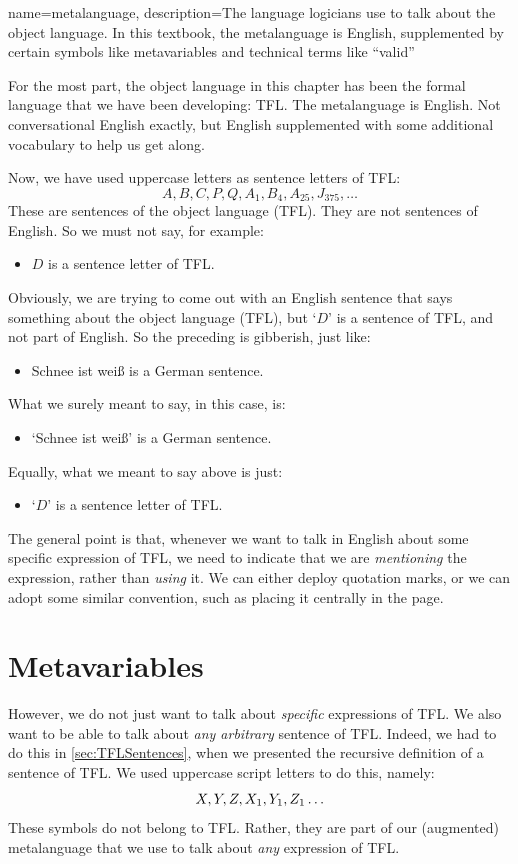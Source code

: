 {
	name=metalanguage,
	description={The language logicians use to talk about the object language. In this textbook, the metalanguage is English, supplemented by certain symbols like metavariables and technical terms like ``valid''}
}

For the most part, the object language in this chapter has been the formal language that we have been developing: TFL. The metalanguage is English. Not conversational English exactly, but English supplemented with some additional vocabulary to help us get along.

Now, we have used uppercase letters as sentence letters of TFL:
$$A, B, C, P, Q, A_1, B_4, A_{25}, J_{375},\ldots$$
These are sentences of the object language (TFL). They are not sentences of English. So we must not say, for example:
\begin{itemize}
	\item $D$ is a sentence letter of TFL.
\end{itemize}
Obviously, we are trying to come out with an English sentence that says something about the object language (TFL), but `$D$' is a sentence of TFL, and not part of English. So the preceding is gibberish, just like:
\begin{itemize}
	\item \foreignlanguage{german}{Schnee ist weiß} is a German sentence.
\end{itemize}
What we surely meant to say, in this case, is:
\begin{itemize}
	\item `\foreignlanguage{german}{Schnee ist weiß}' is a German sentence.
\end{itemize}
Equally, what we meant to say above is just:
\begin{itemize}
	\item `$D$' is a sentence letter of TFL.
\end{itemize}
The general point is that, whenever we want to talk in English about some specific expression of TFL, we need to indicate that we are \emph{mentioning} the expression, rather than \emph{using} it. We can either deploy quotation marks, or we can adopt some similar convention, such as  placing it centrally in the page.



\section{Metavariables}\label{sec:Metavariables}
However, we do not just want to talk about \emph{specific} expressions of TFL. We also want to be able to talk about \emph{any arbitrary} sentence of TFL. Indeed, we had to do this in \cref{sec:TFLSentences}, when we presented the recursive definition of a sentence of TFL. We used uppercase script letters to do this, namely:
$$X, Y, Z,X_1,Y_1,Z_1\ldots$$
These symbols do not belong to TFL. Rather, they are part of our (augmented) metalanguage that we use to talk about \emph{any} expression of TFL. 

